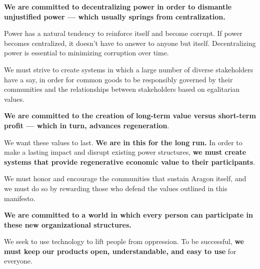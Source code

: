 \textbf{We are committed to decentralizing power in order to dismantle unjustified power — which usually springs from centralization.}

Power has a natural tendency to reinforce itself and become corrupt. If power becomes centralized, it doesn't have to answer to anyone but itself. Decentralizing power is essential to minimizing corruption over time.

We must strive to create systems in which a large number of diverse stakeholders have a say, in order for common goods to be responsibly governed by their communities and the relationships between stakeholders based on egalitarian values.

\textbf{We are committed to the creation of long-term value versus short-term profit — which in turn, advances regeneration}.

We want these values to last. 
\textbf{We are in this for the long run.} 
In order to make a lasting impact and disrupt existing power structures, \textbf{we must create systems that provide regenerative economic value to their participants}.

We must honor and encourage the communities that sustain Aragon itself, and we must do so by rewarding those who defend the values outlined in this manifesto.

\textbf{We are committed to a world in which every person can participate in these new organizational structures.}

We seek to use technology to lift people from oppression. To be successful, \textbf{we must keep our products open, understandable, and easy to use} for everyone.
